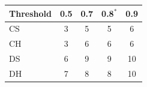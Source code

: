 \begin{tabular}{lcccc}
\toprule
Threshold & 0.5 & 0.7 & 0.8$^\ast$ & 0.9 \\
\midrule
CS & 3 & 5 & 5 & 6 \\
CH & 3 & 6 & 6 & 6 \\
DS & 6 & 9 & 9 & 10 \\
DH & 7 & 8 & 8 & 10 \\
\bottomrule
\end{tabular}
